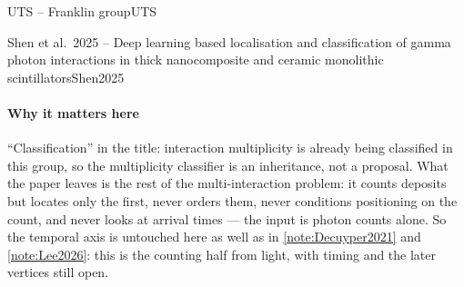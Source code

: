 \begin{programnote}{UTS -- Franklin group}{UTS}
\begin{papernote}{Shen et al.\ 2025 -- Deep learning based localisation and classification of gamma photon interactions in thick nanocomposite and ceramic monolithic scintillators}{Shen2025}
\paragraph{Why it matters here}
``Classification'' in the title: interaction multiplicity is already being
classified in this group, so the multiplicity classifier is an inheritance,
not a proposal. What the paper leaves is the rest of the multi-interaction
problem: it counts deposits but locates only the first, never orders them,
never conditions positioning on the count, and never looks at arrival times
--- the input is photon counts alone. So the temporal axis is untouched here
as well as in \ref{note:Decuyper2021} and \ref{note:Lee2026}: this is the
counting half from light, with timing and the later vertices still open.

\end{papernote}

\end{programnote}


